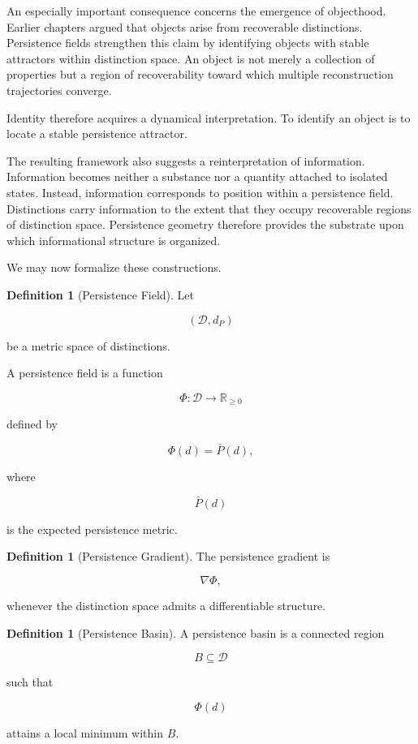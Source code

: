 \documentclass[12pt,oneside]{article}
\theoremstyle{definition}
\newtheorem{definition}[theorem]{Definition} \newtheorem{axiom}[theorem]{Axiom} \newtheorem{remark}[theorem]{Remark} \newtheorem{example}[theorem]{Example}
\begin{document}
An especially important consequence concerns the emergence of objecthood. Earlier chapters argued that objects arise from recoverable distinctions. Persistence fields strengthen this claim by identifying objects with stable attractors within distinction space. An object is not merely a collection of properties but a region of recoverability toward which multiple reconstruction trajectories converge.

Identity therefore acquires a dynamical interpretation. To identify an object is to locate a stable persistence attractor.

The resulting framework also suggests a reinterpretation of information. Information becomes neither a substance nor a quantity attached to isolated states. Instead, information corresponds to position within a persistence field. Distinctions carry information to the extent that they occupy recoverable regions of distinction space. Persistence geometry therefore provides the substrate upon which informational structure is organized.

We may now formalize these constructions.

\begin{definition}[Persistence Field]

Let

\[
(\mathcal D,d_P)
\]

be a metric space of distinctions.

A persistence field is a function

\[
\Phi :
\mathcal D
\rightarrow
\mathbb R_{\ge 0}
\]

defined by

\[
\Phi(d)
=
\bar P(d),
\]

where

\[
\bar P(d)
\]

is the expected persistence metric.

\end{definition}

\begin{definition}[Persistence Gradient]

The persistence gradient is

\[
\nabla \Phi,
\]

whenever the distinction space admits a differentiable structure.

\end{definition}

\begin{definition}[Persistence Basin]

A persistence basin is a connected region

\[
B\subseteq\mathcal D
\]

such that

\[
\Phi(d)
\]

attains a local minimum within \(B\).

\end{definition}
\end{document}
